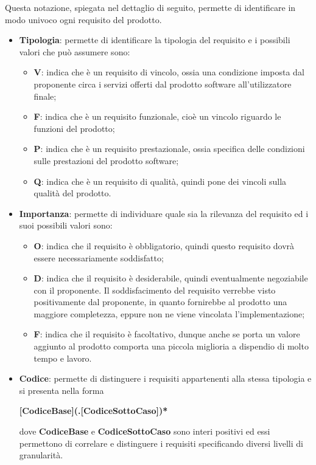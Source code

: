 Questa notazione, spiegata nel dettaglio di seguito, permette di identificare in modo univoco ogni requisito del prodotto.
\begin{itemize}
    \item \textbf{Tipologia}: permette di identificare la tipologia del requisito e i possibili valori che può assumere sono:
    \begin{itemize}
        \item \textbf{V}: indica che è un requisito di vincolo, ossia una condizione imposta dal proponente circa i servizi offerti dal 
        	prodotto software all'utilizzatore finale;
        \item \textbf{F}: indica che è un requisito funzionale, cioè un vincolo riguardo le funzioni del prodotto;
        \item \textbf{P}: indica che è un requisito prestazionale, ossia specifica delle condizioni sulle prestazioni del prodotto software;
        \item \textbf{Q}: indica che è un requisito di qualità, quindi pone dei vincoli sulla qualità del prodotto.
    \end{itemize}
    \item \textbf{Importanza}: permette di individuare quale sia la rilevanza del requisito ed i suoi possibili valori sono:
    \begin{itemize}
        \item \textbf{O}: indica che il requisito è obbligatorio, quindi questo requisito dovrà essere necessariamente 
        soddisfatto;
        \item \textbf{D}: indica che il requisito è desiderabile, quindi eventualmente negoziabile con il proponente. 
        Il soddisfacimento del requisito verrebbe visto positivamente dal proponente, in quanto fornirebbe al prodotto 
        una maggiore completezza, eppure non ne viene vincolata l'implementazione;
        \item \textbf{F}: indica che il requisito è facoltativo, dunque anche se porta un valore aggiunto al prodotto
        comporta una piccola miglioria a dispendio di molto tempo e lavoro.
    \end{itemize}
    
    \item \textbf{Codice}: permette di distinguere i requisiti appartenenti alla stessa tipologia e si presenta nella forma
    	\begin{center}
        	\textbf{[CodiceBase](.[CodiceSottoCaso])*}
    	\end{center}
    	dove \textbf{CodiceBase} e \textbf{CodiceSottoCaso} sono interi positivi ed essi permettono di correlare e distinguere i requisiti 
    	specificando diversi livelli di granularità.
\end{itemize}
 
